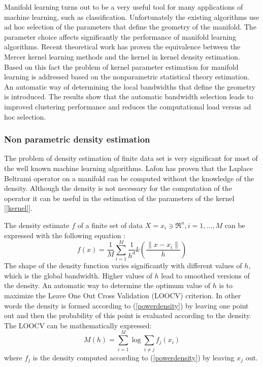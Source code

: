 \documentclass[12pt,letterpaper,doublespaced,ETD,dvips,proposal]{gtthesis}
\begin{document}
\begin{Body}
Manifold learning turns out to be a very useful tool for many
applications of machine learning, such as classification.
Unfortunately the existing algorithms use ad hoc selection of the
parameters that define the geometry of the manifold. The parameter
choice affects significantly the performance of manifold learning
algorithms. Recent theoretical work has proven the equivalence
between the Mercer kernel learning methods and the kernel in kernel
density estimation. Based on this fact the problem of kernel
parameter estimation for manifold learning is addressed based on the
nonparametric statistical theory estimation. An automatic way of
determining the local bandwidths that define the geometry is
introduced. The results show that the automatic bandwidth selection
leads to improved clustering performance and reduces the
computational load versus ad hoc selection.



\subsubsection{Non parametric  density estimation} The problem of
density estimation of finite data set is very significant for most
of the well known machine learning algorithms. Lafon has proven that
the Laplace Beltrami operator on a manifold can be computed without
the knowledge of the density. Although the density is not necessary
for the computation of the operator it can be useful in the
estimation of the parameters of the kernel [\ref{kernel}].

The  density estimate $f$ of a finite set of data $X={x_i\ni
\Re^n,i=1,\dots,M}$ can be expressed with the following equation
\cite{Silverman}:
\begin{equation}\label{powerdensity}
    f(x)=\frac{1}{M}\sum_{i=1}^{M}\frac{1}{h^d}k\left(\frac{\parallel x-x_i
\parallel}{h}\right)
\end{equation}
The shape of the density function varies significantly with
different values of $h$, which is the global bandwidth. Higher
values of $h$ lead to smoothed versions of the  density. An
automatic way to determine the optimum value of $h$ is to maximize
the Leave One Out Cross Validation (LOOCV) criterion. In other words
the density is formed according to (\ref{powerdensity}) by leaving
one point out and then the probability of this point is evaluated
according to the density. The LOOCV can be mathematically expressed:
\begin{equation}
    M(h)=\sum_{i=1}^{M}\log\sum_{i\neq j}f_j(x_i)
\end{equation}
where $f_j$ is the density computed according to
(\ref{powerdensity}) by leaving $x_j$ out.


\end{Body}
\end{document}
